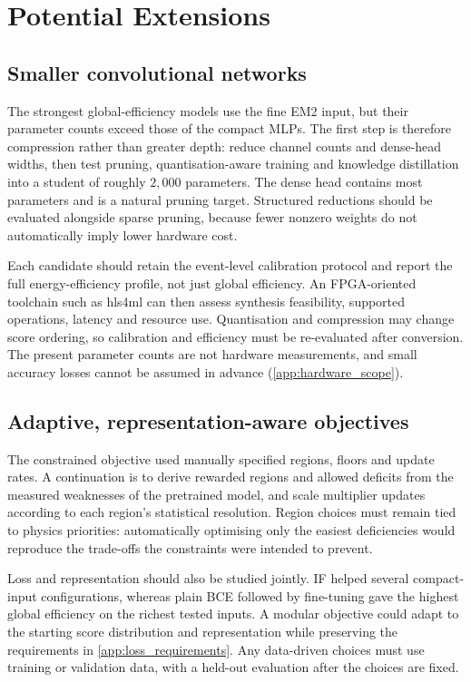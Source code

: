 \section{Potential Extensions}
\label{app:future}

\subsection{Smaller convolutional networks}
The strongest global-efficiency models use the fine EM2 input, but their parameter counts exceed those of the compact MLPs. The first step is therefore compression rather than greater depth: reduce channel counts and dense-head widths, then test pruning, quantisation-aware training and knowledge distillation into a student of roughly $2{,}000$ parameters. The dense head contains most parameters and is a natural pruning target. Structured reductions should be evaluated alongside sparse pruning, because fewer nonzero weights do not automatically imply lower hardware cost.

Each candidate should retain the event-level calibration protocol and report the full energy-efficiency profile, not just global efficiency. An FPGA-oriented toolchain such as hls4ml can then assess synthesis feasibility, supported operations, latency and resource use. Quantisation and compression may change score ordering, so calibration and efficiency must be re-evaluated after conversion. The present parameter counts are not hardware measurements, and small accuracy losses cannot be assumed in advance (\cref{app:hardware_scope}).

\subsection{Adaptive, representation-aware objectives}
The constrained objective used manually specified regions, floors and update rates. A continuation is to derive rewarded regions and allowed deficits from the measured weaknesses of the pretrained model, and scale multiplier updates according to each region's statistical resolution. Region choices must remain tied to physics priorities: automatically optimising only the easiest deficiencies would reproduce the trade-offs the constraints were intended to prevent.

Loss and representation should also be studied jointly. IF helped several compact-input configurations, whereas plain BCE followed by fine-tuning gave the highest global efficiency on the richest tested inputs. A modular objective could adapt to the starting score distribution and representation while preserving the requirements in \cref{app:loss_requirements}. Any data-driven choices must use training or validation data, with a held-out evaluation after the choices are fixed.

